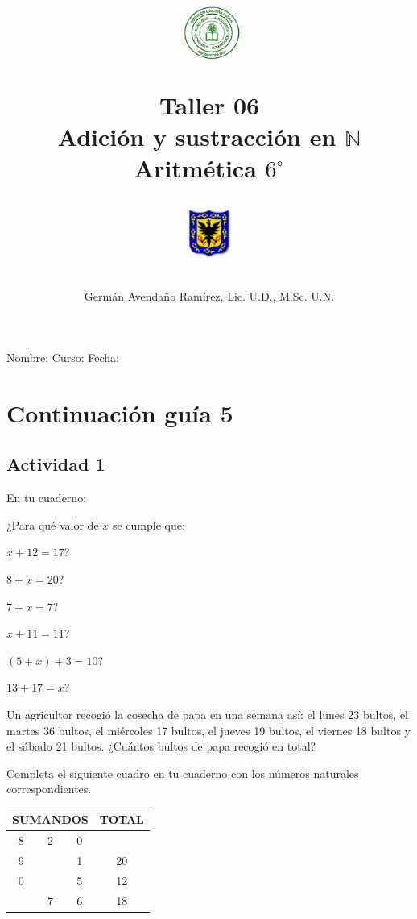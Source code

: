 \documentclass[10pt,twoside]{article}
\author{Germ\'an Avenda\~no Ram\'irez, Lic. U.D., M.Sc. U.N.}
\title{\begin{minipage}{.2\textwidth}
\includegraphics[height=1.75cm]{Images/logo-colegio.png}\end{minipage}
\begin{minipage}{.55\textwidth}
\begin{center}
Taller 06\\Adición y sustracción en $\mathbb{N}$  \\
Aritmética $6^{\circ}$
\end{center}
\end{minipage}\hfill
\begin{minipage}{.2\textwidth}
\includegraphics[height=1.75cm]{Images/logo-sed.png} 
\end{minipage}}
\date{}
\begin{document}
\maketitle
Nombre: \hrulefill Curso: \underline{\hspace*{44pt}} Fecha: \underline{\hspace*{2.5cm}}
\section*{Continuaci\'on gu\'ia 5}
\subsection*{Actividad 1}
En tu cuaderno:
\begin{enumerate}
\item ¿Para qué valor de $x$ se cumple que:
\begin{enumerate}
\begin{multicols}{2}
\item $x+12=17$?
\item $8+x=20$?
\item $7+x=7$?
\item $x+11=11$?
\item $(5+x)+3=10$?
\item $13+17=x$?
\end{multicols}
\end{enumerate}
\item Un agricultor recogió la cosecha de papa en una semana así: el lunes 23 bultos, el martes 36 bultos, el miércoles 17 bultos, el jueves 19 bultos, el viernes 18 bultos y el sábado 21 bultos. ¿Cuántos bultos de papa recogió en total?

\begin{minipage}{0.45\textwidth}
\item Completa el siguiente cuadro en tu cuaderno con los números naturales
correspondientes.
\end{minipage}\hfill
\begin{minipage}{.45\textwidth}
\begin{tabular}{|c|c|c|c|}
\hline 
\multicolumn{3}{|c|}{SUMANDOS} & TOTAL \\ 
\hline 
8 & 2 & 0 &  \\ 
\hline 
9 &  & 1 & 20 \\ 
\hline 
0 &  & 5 & 12 \\ 
\hline 
 & 7 & 6 & 18 \\ 
\hline 
\end{tabular} 
\end{minipage}


\end{enumerate}
\end{document}

